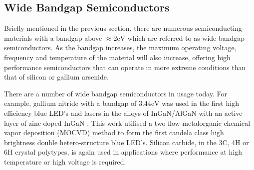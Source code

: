 \subsection{Wide Bandgap Semiconductors}
Briefly mentioned in the previous section, there are numerous semiconducting materials with a bandgap above $\approx2\si{\electronvolt}$ which are referred to as wide bandgap semiconductors. As the bandgap increases, the maximum operating voltage, frequency and temperature of the material will also increase, offering high performance semiconductors that can operate in more extreme conditions than that of silicon or gallium arsenide.

There are a number of wide bandgap semiconductors in usage today. For example, gallium nitride with a bandgap of $3.44\si{\electronvolt}$ was used in the first high efficiency blue LED's and lasers in the alloys of InGaN/AlGaN with an active layer of zinc doped InGaN \cite{nakamura1994}. This work utilised a two-flow metalorganic chemical vapor deposition (MOCVD) method to form the first candela class high brightness double hetero-structure blue LED's. Silicon carbide, in the 3C, 4H or 6H crystal polytypes, is again used in applications where performance at high temperature or high voltage is required.

